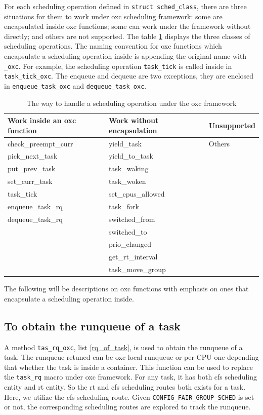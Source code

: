 For each scheduling operation defined in \texttt{struct sched\_class},
there are three situations for them to work under oxc scheduling framework: 
some are encapsulated inside oxc functions; some can work under the framework
without directly; and others are not supported. The table \ref{tab:op_classes}
displays the three classes of scheduling operations. The naming convention
for oxc functions which encapsulate a scheduling operation inside is appending
the original name with \texttt{\_oxc}. For example, the scheduling operation
\texttt{task\_tick} is called inside in \texttt{task\_tick\_oxc}.
The enqueue and dequeue are two exceptions, they are enclosed in 
\texttt{enqueue\_task\_oxc} and \texttt{dequeue\_task\_oxc}.
\begin{table}[thbp]
  \centering
  \begin{tabular}{l|l|l}\hline
	\small{Work inside an oxc function} & \small{Work without encapsulation} & \small{Unsupported}\\\hline
		check\_preempt\_curr	& yield\_task				& Others	\\
		pick\_next\_task	& yield\_to\_task			&		\\
		put\_prev\_task		& task\_waking				&		\\
		set\_curr\_task		& task\_woken				&		\\
		task\_tick		& set\_cpus\_allowed			&		\\
		enqueue\_task\_rq	& task\_fork				&		\\
		dequeue\_task\_rq	& switched\_from			&		\\
					& switched\_to				&		\\
					& prio\_changed				&		\\
					& get\_rt\_interval			&		\\
					& task\_move\_group			&		\\\hline
  \end{tabular}	
  \caption{The way to handle a scheduling operation under the oxc framework}
  \label{tab:op_classes}
\end{table}

The following will be descriptions on oxc functions with emphasis on ones that
encapsulate a scheduling operation inside.

\subsection{To obtain the runqueue of a task}
A method \texttt{tas\_rq\_oxc}, list \ref{rq_of_task}, is used to obtain 
the runqueue of a task.
The runqueue retuned can be oxc local runqueue or per CPU one depending
that whether the task is inside a container. This function can be used
to replace the \texttt{task\_rq} macro under oxc framework. 
For any task, it has both cfs scheduling entity and rt entity. So the
rt and cfs scheduling routes both exists for a task. Here, we utilize
the cfs scheduling route. Given \texttt{CONFIG\_FAIR\_GROUP\_SCHED}
is set or not, the corresponding scheduling routes are explored to
track the runqueue.

